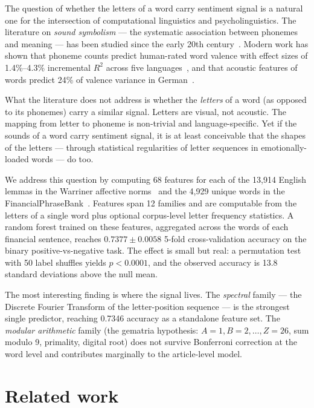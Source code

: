 \documentclass{article}
\begin{document}
The question of whether the letters of a word carry sentiment signal is a natural one for the intersection of computational linguistics and psycholinguistics. The literature on \emph{sound symbolism} --- the systematic association between phonemes and meaning --- has been studied since the early 20th century~\citep{sapir1929, kohler1929, asch1955}. Modern work has shown that phoneme counts predict human-rated word valence with effect sizes of 1.4\%--4.3\% incremental $R^2$ across five languages~\citep{adelman2018}, and that acoustic features of words predict 24\% of valence variance in German~\citep{aryani2018}.

What the literature does not address is whether the \emph{letters} of a word (as opposed to its phonemes) carry a similar signal. Letters are visual, not acoustic. The mapping from letter to phoneme is non-trivial and language-specific. Yet if the sounds of a word carry sentiment signal, it is at least conceivable that the shapes of the letters --- through statistical regularities of letter sequences in emotionally-loaded words --- do too.

We address this question by computing 68 features for each of the 13,914 English lemmas in the Warriner affective norms~\citep{warriner2013} and the 4,929 unique words in the FinancialPhraseBank~\citep{malo2014}. Features span 12 families and are computable from the letters of a single word plus optional corpus-level letter frequency statistics. A random forest trained on these features, aggregated across the words of each financial sentence, reaches $0.7377 \pm 0.0058$ 5-fold cross-validation accuracy on the binary positive-vs-negative task. The effect is small but real: a permutation test with 50 label shuffles yields $p < 0.0001$, and the observed accuracy is 13.8 standard deviations above the null mean.

The most interesting finding is where the signal lives. The \emph{spectral} family --- the Discrete Fourier Transform of the letter-position sequence --- is the strongest single predictor, reaching 0.7346 accuracy as a standalone feature set. The \emph{modular arithmetic} family (the gematria hypothesis: $A=1, B=2, \ldots, Z=26$, sum modulo 9, primality, digital root) does not survive Bonferroni correction at the word level and contributes marginally to the article-level model.

\section{Related work}
\end{document}
